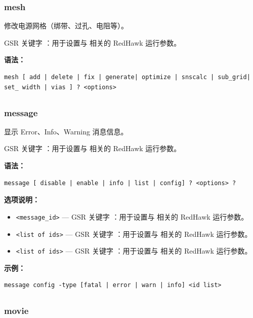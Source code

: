 \subsubsection*{mesh}

修改电源网格（绑带、过孔、电阻等）。

GSR 关键字 ：用于设置与  相关的 RedHawk 运行参数。

\textbf{语法：}
\begin{lstlisting}
mesh [ add | delete | fix | generate| optimize | snscalc | sub_grid| set_ width | vias ] ? <options>
\end{lstlisting}

\subsection{}
\subsubsection*{message}

显示 Error、Info、Warning 消息信息。

GSR 关键字 ：用于设置与  相关的 RedHawk 运行参数。

\textbf{语法：}
\begin{lstlisting}
message [ disable | enable | info | list | config] ? <options> ?
\end{lstlisting}

\textbf{选项说明：}
\begin{itemize}
\item \texttt{<message\_id>} — GSR 关键字 ：用于设置与  相关的 RedHawk 运行参数。
\item \texttt{<list of ids>} — GSR 关键字 ：用于设置与  相关的 RedHawk 运行参数。
\item \texttt{<list of ids>} — GSR 关键字 ：用于设置与  相关的 RedHawk 运行参数。
\end{itemize}

\textbf{示例：}
\begin{lstlisting}
message config -type [fatal | error | warn | info] <id list>
\end{lstlisting}

\subsection{}
\subsubsection*{movie}


